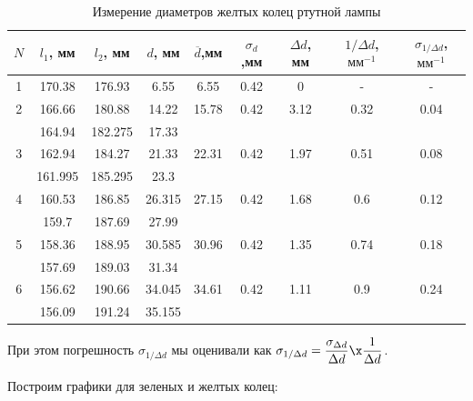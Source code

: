 \documentclass[a4paper, 12pt]{article}%
\begin{document}
	\begin{table}[h!]
		\caption{Измерение диаметров желтых колец ртутной лампы}
		\begin{center}
			\begin{tabular}{|c|c|c|c|c|c|c|c|c|}
				\hline
					$ N $ & $ l_1 $, мм & $ l_2 $, мм & $ d $, мм & $ \overline{d} $,мм &  $ \sigma_d $,мм & $ \Delta d $, мм  &  $ 1/\Delta d $,$ мм^{-1} $ & $ \sigma_{1/\Delta d} $,$ мм^{-1} $\\
					\hline
			1 & 170.38 & 176.93 & 6.55 & 6.55 & 0.42 & 0 & - & - \\
			2 & 166.66 & 180.88 & 14.22 & 15.78 & 0.42 & 3.12 & 0.32 & 0.04 \\
			\text{} & 164.94 & 182.275 & 17.33 & \text{} & \text{} & \text{} & \text{} & \text{} \\
			
			3 & 162.94 & 184.27 & 21.33 & 22.31 & 0.42 & 1.97 & 0.51 & 0.08 \\
			\text{} & 161.995 & 185.295 & 23.3 & \text{} & \text{} & \text{} & \text{} & \text{} \\
			4 & 160.53 & 186.85 & 26.315 & 27.15 & 0.42 & 1.68 & 0.6 & 0.12 \\
			\text{} & 159.7 & 187.69 & 27.99 & \text{} & \text{} & \text{} & \text{} & \text{} \\
			5 & 158.36 & 188.95 & 30.585 & 30.96 & 0.42 & 1.35 & 0.74 & 0.18 \\
			\text{} & 157.69 & 189.03 & 31.34 & \text{} & \text{} & \text{} & \text{} & \text{} \\
			6 & 156.62 & 190.66 & 34.045 & 34.61 & 0.42 & 1.11 & 0.9 & 0.24 \\
			\text{} & 156.09 & 191.24 & 35.155 & \text{} & \text{} & \text{} & \text{} & \text{} \\
				\hline
			\end{tabular}
		\end{center}
		\label{table}
	\end{table}	

\item При этом погрешность $ \sigma_{1/\Delta d} $ мы оценивали как $ \sigma_{1/\Delta d} = \dfrac{\sigma_{\Delta d}}{\Delta d} \x \dfrac{1}{\Delta d} $.
	
\item Построим графики для зеленых и желтых колец:
\end{document}
